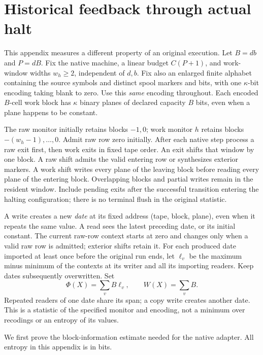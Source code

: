 \section{Historical feedback through actual halt}\label{sec:feedback}

This appendix measures a different property of an original execution.
Let $B=db$ and $P=dB$. Fix the native machine, a linear budget $C(P+1)$,
and work-window widths $w_h\ge2$, independent of $d,b$. Fix also an
enlarged finite alphabet containing the source symbols and distinct spool
markers and bits, with one $\kappa$-bit encoding taking blank to zero.
Use this \emph{same} encoding throughout. Each encoded $B$-cell work block
has $\kappa$ binary planes of declared capacity $B$ bits, even when a
plane happens to be constant.

The raw monitor initially retains blocks $-1,0$; work monitor $h$ retains
blocks $-(w_h-1),\ldots,0$. Admit raw row zero initially. After each native
step process a raw exit first, then work exits in fixed tape order. An
exit shifts that window by one block. A raw shift admits the valid entering
row or synthesizes exterior markers. A work shift writes every plane of
the leaving block before reading every plane of the entering block.
Overlapping blocks and partial writes remain in the resident window. Include
pending exits after the successful transition entering the halting
configuration; there is no terminal flush in the original statistic.

A write creates a new \emph{date} at its fixed address (tape, block, plane),
even when it repeats the same value. A read sees the latest preceding date,
or its initial constant. The current raw-row context starts at zero and
changes only when a valid raw row is admitted; exterior shifts retain it.
For each produced date imported at least once before the original run ends,
let $\ell_v$ be the maximum minus minimum of the contexts at its writer
and all its importing readers. Keep dates subsequently overwritten. Set
\[
 \Phi(X)=\sum_v B\ell_v,\qquad W(X)=\sum_v B.
\]
Repeated readers of one date share its span; a copy write creates another
date. This is a statistic of the specified monitor and encoding, not a
minimum over recodings or an entropy of its values.

We first prove the block-information estimate needed for the native adapter.
All entropy in this appendix is in bits.

